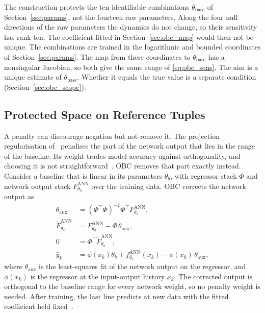 The construction protects the ten identifiable combinations
$\theta_{\mathrm{base}}$ of Section~\ref{sec:params}, not the fourteen raw
parameters.
Along the four null directions of the raw parameters the dynamics do not
change, so their sensitivity has rank ten.
The coefficient fitted in Section~\ref{sec:obc_map} would then not be unique.
The combinations are trained in the logarithmic and bounded coordinates of
Section~\ref{sec:params}.
The map from these coordinates to $\theta_{\mathrm{base}}$ has a nonsingular
Jacobian, so both give the same range of \eqref{eq:obc_sens}.
The aim is a unique estimate of $\theta_{\mathrm{base}}$.
Whether it equals the true value is a separate condition
(Section~\ref{sec:obc_scope}).

\subsection{Protected Space on Reference Tuples}\label{sec:obc_space}
A penalty can discourage negation but not remove it.
The projection regularisation of~\cite{gyorok2025l4dc} penalises the part of
the network output that lies in the range of the baseline.
Its weight trades model accuracy against orthogonality, and choosing it is
not straightforward~\cite[Sec.~1]{gyorok2026obc}.
OBC removes that part exactly instead.
Consider a baseline that is linear in its parameters $\theta_b$, with
regressor stack $\Phi$ and network output stack
$F^{\mathrm{ANN}}_{\theta_a}$ over the training data.
OBC corrects the network output as~\cite[Eqs.~(8), (10), (11)]{gyorok2026obc}
\begin{equation}
\begin{aligned}
 \theta_{\mathrm{aux}}&=(\Phi^\top\Phi)^{-1}\Phi^\top F^{\mathrm{ANN}}_{\theta_a},\\
 \widetilde F^{\mathrm{ANN}}_{\theta_a}&=F^{\mathrm{ANN}}_{\theta_a}-\Phi\,\theta_{\mathrm{aux}},\\
 0&=\Phi^\top\widetilde F^{\mathrm{ANN}}_{\theta_a},\\
 \hat y_k&=\phi(x_k)\theta_b+f^{\mathrm{ANN}}_{\theta_a}(x_k)-\phi(x_k)\,\theta_{\mathrm{aux}},
\end{aligned}
\label{eq:obc_gyorok}
\end{equation}
where $\theta_{\mathrm{aux}}$ is the least-squares fit of the network output
on the regressor, and $\phi(x_k)$ is the regressor at the input-output
history $x_k$.
The corrected output is orthogonal to the baseline range for every network
weight, so no penalty weight is needed.
After training, the last line predicts at new data with the fitted
coefficient held fixed~\cite[Eq.~(13)]{gyorok2026obc}.


